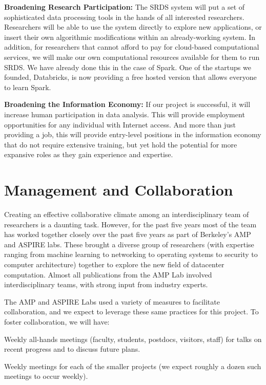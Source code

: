{\bf Broadening Research Participation:} The SRDS system will put a set of sophisticated data processing tools in the hands of all interested researchers.  Researchers will be able to use the system directly to explore new applications, or insert their own algorithmic modifications within an already-working system.  In addition, for researchers that cannot afford to pay for cloud-based computational services, we will make our own computational resources available for them to run SRDS. We have already done this in the case of Spark. One of the startups we founded, Databricks, is now providing a free hosted version that allows everyone to learn Spark.

{\bf Broadening the Information Economy:} If our project is successful, it will increase human participation in data analysis.  This will provide employment opportunities for any individual with Internet access.  And more than just providing a job, this will provide entry-level positions in the information economy that do not require extensive training, but yet hold the potential for more expansive roles as they gain experience and expertise.  

\section{Management and Collaboration}

Creating an effective collaborative climate among an interdisciplinary team of researchers is a daunting task. However, for the past five years most of the team has worked together closely over the past five years as part of Berkeley's AMP and ASPIRE labs.  These brought a diverse group of researchers (with expertise ranging from machine learning to networking to operating systems to security to computer architecture) together to explore the new field of datacenter computation. Almost all publications from the AMP Lab involved interdisciplinary teams, with strong input from industry experts.

The AMP and ASPIRE Labs used a variety of measures to facilitate collaboration, and we expect to leverage these same practices for this project.   To foster collaboration, we will have:


\1  Weekly all-hands meetings (faculty, students, postdocs, visitors, staff) for talks on recent progress and to discuss future plans.

\1  Weekly meetings for each of the smaller projects (we expect roughly a dozen such meetings to occur weekly).

